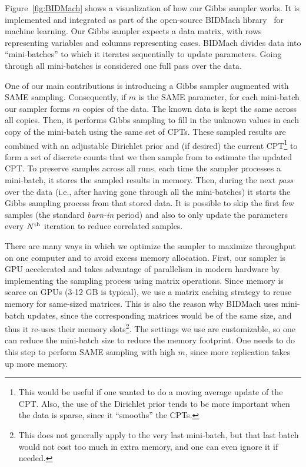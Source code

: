 \documentclass{article} %
\begin{document}
Figure~\ref{fig:BIDMach} shows a visualization of how our Gibbs sampler works. It is implemented and
integrated as part of the open-source BIDMach library~\citep{bidmach} for machine learning. Our
Gibbs sampler expects a data matrix, with rows representing variables and columns representing
cases. BIDMach divides data into ``mini-batches'' to which it iterates sequentially to update
parameters. Going through all mini-batches is considered one full pass over the data.

One of our main contributions is introducing a Gibbs sampler augmented with SAME sampling.
Consequently, if $m$ is the SAME parameter, for each mini-batch our sampler forms $m$ copies of the
data.  The known data is kept the same across all copies. Then, it performs Gibbs sampling to fill
in the unknown values in each copy of the mini-batch using the same set of CPTs.  These sampled
results are combined with an adjustable Dirichlet prior and (if desired) the current
CPT\footnote{This would be useful if one wanted to do a moving average update of the CPT. Also,
the use of the Dirichlet prior tends to be more important when the data is sparse, since it
``smooths'' the CPTs.} to form a set of discrete counts that we then sample from to estimate the
updated CPT. To preserve samples across all runs, each time the sampler processes a mini-batch, it
stores the sampled results in memory. Then, during the next \emph{pass} over the data (i.e., after
having gone through all the mini-batches) it starts the Gibbs sampling process from that stored
data. It is possible to skip the first few samples (the standard \emph{burn-in} period) and
also to only update the parameters every $N^{\rm th}$ iteration to reduce correlated samples.

There are many ways in which we optimize the sampler to maximize throughput on one computer and to
avoid excess memory allocation. First, our sampler is GPU accelerated and takes advantage of
parallelism in modern hardware by implementing the sampling process using matrix operations. Since
memory is scarce on GPUs (3-12 GB is typical), we use a matrix caching strategy to reuse memory for
same-sized matrices.  This is also the reason why BIDMach uses mini-batch updates, since the
corresponding matrices would be of the same size, and thus it re-uses their memory
slots\footnote{This does not generally apply to the very last mini-batch, but that last batch would
not cost too much in extra memory, and one can even ignore it if needed.}. The settings we use are
customizable, so one can reduce the mini-batch size to reduce the memory footprint. One needs to do
this step to perform SAME sampling with high $m$, since more replication takes up more memory.
\end{document}
